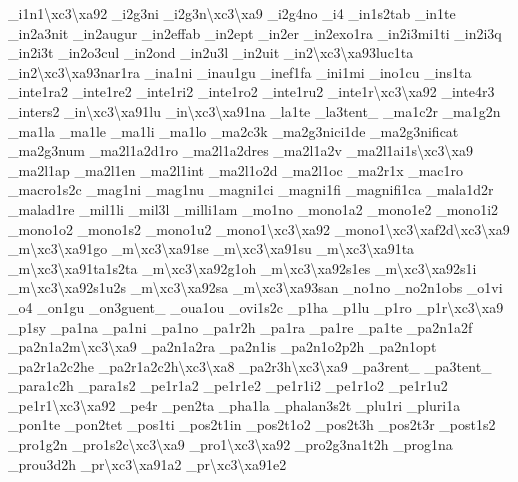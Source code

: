 \begin{DoxyCompactItemize}
\-\_\-i1n1\textbackslash{}xc3\textbackslash{}xa92 \-\_\-i2g3ni \-\_\-i2g3n\textbackslash{}xc3\textbackslash{}xa9 \-\_\-i2g4no \-\_\-i4 \-\_\-in1s2tab \-\_\-in1te \-\_\-in2a3nit \-\_\-in2augur \-\_\-in2effab \-\_\-in2ept \-\_\-in2er \-\_\-in2exo1ra \-\_\-in2i3mi1ti \-\_\-in2i3q \-\_\-in2i3t \-\_\-in2o3cul \-\_\-in2ond \-\_\-in2u3l \-\_\-in2uit \-\_\-in2\textbackslash{}xc3\textbackslash{}xa93luc1ta \-\_\-in2\textbackslash{}xc3\textbackslash{}xa93nar1ra \-\_\-ina1ni \-\_\-inau1gu \-\_\-inef1fa \-\_\-ini1mi \-\_\-ino1cu \-\_\-ins1ta \-\_\-inte1ra2 \-\_\-inte1re2 \-\_\-inte1ri2 \-\_\-inte1ro2 \-\_\-inte1ru2 \-\_\-inte1r\textbackslash{}xc3\textbackslash{}xa92 \-\_\-inte4r3 \-\_\-inters2 \-\_\-in\textbackslash{}xc3\textbackslash{}xa91lu \-\_\-in\textbackslash{}xc3\textbackslash{}xa91na \-\_\-la1te \-\_\-la3tent\-\_\- \-\_\-ma1c2r \-\_\-ma1g2n \-\_\-ma1la \-\_\-ma1le \-\_\-ma1li \-\_\-ma1lo \-\_\-ma2c3k \-\_\-ma2g3nici1de \-\_\-ma2g3nificat \-\_\-ma2g3num \-\_\-ma2l1a2d1ro \-\_\-ma2l1a2dres \-\_\-ma2l1a2v \-\_\-ma2l1ai1s\textbackslash{}xc3\textbackslash{}xa9 \-\_\-ma2l1ap \-\_\-ma2l1en \-\_\-ma2l1int \-\_\-ma2l1o2d \-\_\-ma2l1oc \-\_\-ma2r1x \-\_\-mac1ro \-\_\-macro1s2c \-\_\-mag1ni \-\_\-mag1nu \-\_\-magni1ci \-\_\-magni1fi \-\_\-magnifi1ca \-\_\-mala1d2r \-\_\-malad1re \-\_\-mil1li \-\_\-mil3l \-\_\-milli1am \-\_\-mo1no \-\_\-mono1a2 \-\_\-mono1e2 \-\_\-mono1i2 \-\_\-mono1o2 \-\_\-mono1s2 \-\_\-mono1u2 \-\_\-mono1\textbackslash{}xc3\textbackslash{}xa92 \-\_\-mono1\textbackslash{}xc3\textbackslash{}xaf2d\textbackslash{}xc3\textbackslash{}xa9 \-\_\-m\textbackslash{}xc3\textbackslash{}xa91go \-\_\-m\textbackslash{}xc3\textbackslash{}xa91se \-\_\-m\textbackslash{}xc3\textbackslash{}xa91su \-\_\-m\textbackslash{}xc3\textbackslash{}xa91ta \-\_\-m\textbackslash{}xc3\textbackslash{}xa91ta1s2ta \-\_\-m\textbackslash{}xc3\textbackslash{}xa92g1oh \-\_\-m\textbackslash{}xc3\textbackslash{}xa92s1es \-\_\-m\textbackslash{}xc3\textbackslash{}xa92s1i \-\_\-m\textbackslash{}xc3\textbackslash{}xa92s1u2s \-\_\-m\textbackslash{}xc3\textbackslash{}xa92sa \-\_\-m\textbackslash{}xc3\textbackslash{}xa93san \-\_\-no1no \-\_\-no2n1obs \-\_\-o1vi \-\_\-o4 \-\_\-on1gu \-\_\-on3guent\-\_\- \-\_\-oua1ou \-\_\-ovi1s2c \-\_\-p1ha \-\_\-p1lu \-\_\-p1ro \-\_\-p1r\textbackslash{}xc3\textbackslash{}xa9 \-\_\-p1sy \-\_\-pa1na \-\_\-pa1ni \-\_\-pa1no \-\_\-pa1r2h \-\_\-pa1ra \-\_\-pa1re \-\_\-pa1te \-\_\-pa2n1a2f \-\_\-pa2n1a2m\textbackslash{}xc3\textbackslash{}xa9 \-\_\-pa2n1a2ra \-\_\-pa2n1is \-\_\-pa2n1o2p2h \-\_\-pa2n1opt \-\_\-pa2r1a2c2he \-\_\-pa2r1a2c2h\textbackslash{}xc3\textbackslash{}xa8 \-\_\-pa2r3h\textbackslash{}xc3\textbackslash{}xa9 \-\_\-pa3rent\-\_\- \-\_\-pa3tent\-\_\- \-\_\-para1c2h \-\_\-para1s2 \-\_\-pe1r1a2 \-\_\-pe1r1e2 \-\_\-pe1r1i2 \-\_\-pe1r1o2 \-\_\-pe1r1u2 \-\_\-pe1r1\textbackslash{}xc3\textbackslash{}xa92 \-\_\-pe4r \-\_\-pen2ta \-\_\-pha1la \-\_\-phalan3s2t \-\_\-plu1ri \-\_\-pluri1a \-\_\-pon1te \-\_\-pon2tet \-\_\-pos1ti \-\_\-pos2t1in \-\_\-pos2t1o2 \-\_\-pos2t3h \-\_\-pos2t3r \-\_\-post1s2 \-\_\-pro1g2n \-\_\-pro1s2c\textbackslash{}xc3\textbackslash{}xa9 \-\_\-pro1\textbackslash{}xc3\textbackslash{}xa92 \-\_\-pro2g3na1t2h \-\_\-prog1na \-\_\-prou3d2h \-\_\-pr\textbackslash{}xc3\textbackslash{}xa91a2 \-\_\-pr\textbackslash{}xc3\textbackslash{}xa91e2 
\end{DoxyCompactItemize}
